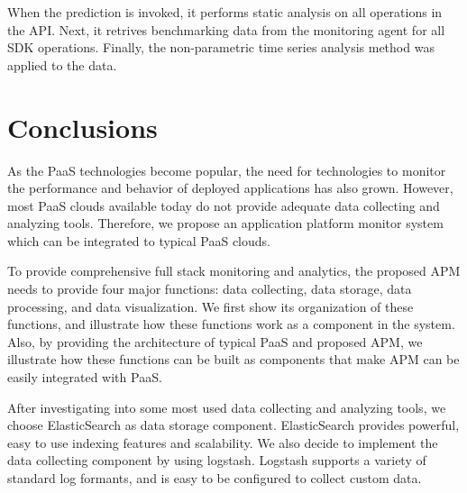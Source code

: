 \documentclass[11pt]{article}
\begin{document}
When the prediction is invoked, it performs static analysis on all operations in the API. Next, it retrives benchmarking data from
the monitoring agent for all SDK operations. Finally, the non-parametric time series analysis method was applied to the data.

\section{Conclusions}
As the PaaS technologies become popular, the need for technologies to monitor the performance and behavior of
deployed applications has also grown. However, most PaaS clouds available today do not provide adequate
data collecting and analyzing tools. Therefore, we propose an application platform monitor system which can be
integrated to typical PaaS clouds.

To provide comprehensive full stack monitoring and analytics, the proposed APM needs to provide four major functions:
data collecting, data storage, data processing, and data visualization. We first show its organization of
these functions, and illustrate how these functions work as a component in the system. Also, by providing the
architecture of typical PaaS and proposed APM, we illustrate how these functions can be built as components that
make APM can be easily integrated with PaaS.

After investigating into some most used data collecting and analyzing tools, we choose ElasticSearch as data storage
component. ElasticSearch provides powerful, easy to use indexing features and scalability. We also decide to
implement the data collecting component by using logstash. Logstash supports a variety of standard log formants,
and is easy to be configured to collect custom data.
\end{document}
